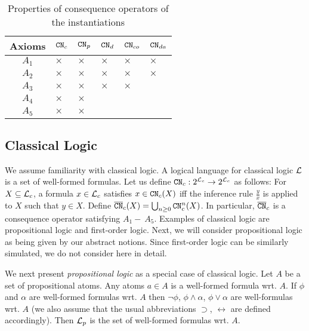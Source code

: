 \begin{table} 
\centering
 \begin{tabular}{c l l l l l}
   \toprule
   Axioms & $\texttt{\textup{CN}}_c$  & $\texttt{\textup{CN}}_{p}$ & $\texttt{\textup{CN}}_{d}$ & $\texttt{\textup{CN}}_{co}$ & $\texttt{\textup{CN}}_{da}$ \\
   \midrule
   $A_1$ & $\times$ & $\times$ & $\times$ & $\times$   &  $\times$  \\
   $A_2$ & $\times$ & $\times$ & $\times$  & $\times$  & $\times$ \\
   $A_3$ & $ \times $ & $\times$ & $\times$ & $\times$ &   \\
   $A_4$ & $\times$ & $\times$ &  &  &    \\
   $A_5$ & $\times$ & $\times$ &  &  &  \\
   \bottomrule
 \end{tabular}
 \caption{Properties of consequence operators of the instantiations}
 \label{tab:properties} 
\end{table}
%

\subsection{Classical Logic}
We assume familiarity with classical logic. A logical language for classical logic $\mathcal{L}$ is a set of well-formed formulas. Let us define $\texttt{\textup{CN}}_c: 2^{\mathcal{L}_c} \to 2^{\mathcal{L}_c}$ as follows:  
For $X \subseteq \mathcal{L}_c$, a formula $x \in \mathcal{L}_c$ satisfies $x \in \texttt{\textup{CN}}_c(X)$ iff the inference rule $\frac{y}{x}$ is applied to $X$ such that $y \in X$. Define $\overline{\texttt{\textup{CN}}}_c(X) = \bigcup_{n \geq 0}\texttt{\textup{CN}}_{c}^{n}(X)$. In particular, $\overline{\texttt{\textup{CN}}}_c$ is a consequence operator satisfying $A_1 -\ A_5$. Examples of classical logic are propositional logic and first-order logic. Next, we will consider propositional logic as being given by our abstract notions. Since first-order logic can be similarly simulated, we do not consider here in detail.

We next present \emph{propositional logic} as a special case of classical logic.
Let $A$  be a set of propositional atoms. Any atoms $a \in A$ is a well-formed formula wrt. $A$. If $\phi$ and $\alpha$ are well-formed formulas wrt. $A$ then $\neg \phi$, $\phi \wedge \alpha$, $\phi \vee \alpha$ are well-formulas wrt. $A$ (we also assume that the usual abbreviations $\supset$, $\leftrightarrow$ are defined accordingly). Then $\mathcal{L}_{p}$ is the set of well-formed formulas wrt. $A$.

